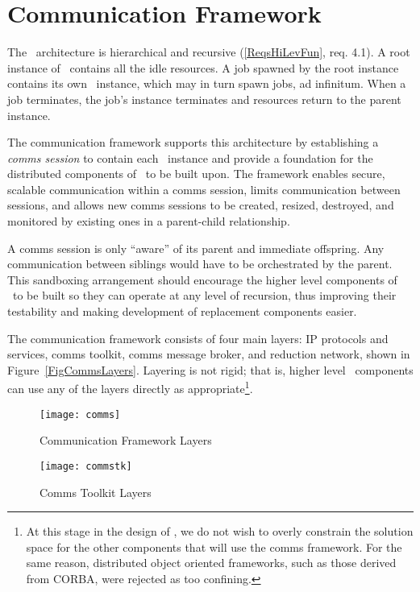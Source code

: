 \section{Communication Framework}\label{SecComms}

The \ngrm\ architecture is hierarchical and recursive
(\ref{ReqsHiLevFun}, req. 4.1).
A root instance of \ngrm\ contains all the
idle resources.  A job spawned by the root instance contains
its own \ngrm\ instance, which may in turn spawn jobs, ad infinitum.
When a job terminates, the job's instance terminates and resources
return to the parent instance.

The communication framework supports this architecture by
establishing a {\em comms session} to contain each \ngrm\ instance
and provide a foundation for the distributed components of \ngrm\ to
be built upon.
The framework enables secure, scalable communication
within a comms session, limits communication between sessions,
and allows new comms sessions to be created, resized, destroyed,
and monitored by existing ones in a parent-child relationship.

A comms session is only ``aware'' of its parent and immediate offspring.
Any communication between siblings would have to be orchestrated by
the parent.  This sandboxing arrangement should encourage the higher level
components of \ngrm\ 
to be built so they can operate at any level of recursion, thus improving
their testability and making development of replacement components easier.

The communication framework consists of four main layers:
IP protocols and services, comms toolkit, comms message broker, and
reduction network, shown
in Figure~\ref{FigCommsLayers}.  Layering is not rigid;
that is, higher level \ngrm\ components can use any of the
layers directly as appropriate\footnote{At this stage in the design of \ngrm,
we do not wish to overly constrain the solution space for the other
components that will use the comms framework.  For the same reason,
distributed object oriented frameworks, such as those derived from
CORBA, were rejected as too confining.}.

\begin{figure}
\begin{minipage}[b]{0.45\linewidth}
\centering
\texttt{[image: comms]}
\caption{Communication Framework Layers}
\label{FigCommsLayers}
\end{minipage}
\hspace{0.5cm}
\begin{minipage}[b]{0.45\linewidth}
\centering
\texttt{[image: commstk]}
\caption{Comms Toolkit Layers}
\label{FigCommsTK}
\end{minipage}
\end{figure}

